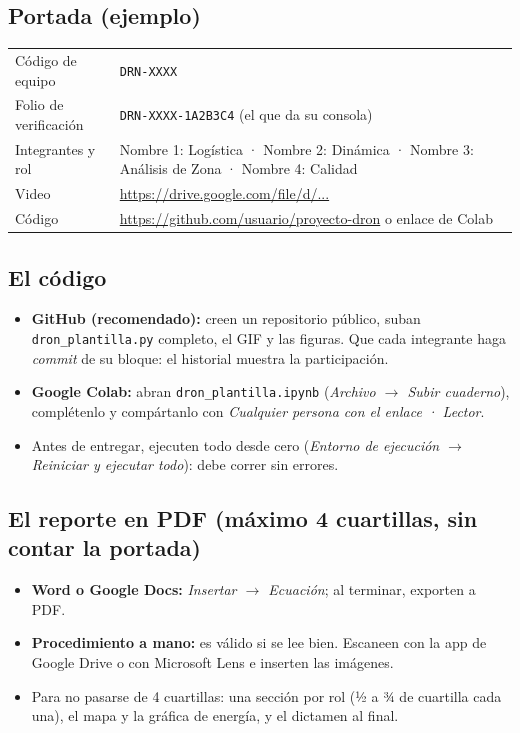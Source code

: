 \documentclass[11pt,letterpaper]{article}
\begin{document}
\subsection*{Portada (ejemplo)}
\begin{center}\small
\begin{tabularx}{0.9\linewidth}{@{}l Y@{}}\toprule
Código de equipo & \texttt{DRN-XXXX} \\
Folio de verificación & \texttt{DRN-XXXX-1A2B3C4} (el que da su consola) \\
Integrantes y rol & Nombre 1: Logística · Nombre 2: Dinámica · Nombre 3: Análisis de Zona · Nombre 4: Calidad \\
Video & \url{https://drive.google.com/file/d/...} \\
Código & \url{https://github.com/usuario/proyecto-dron} o enlace de Colab \\ \bottomrule
\end{tabularx}\end{center}

\subsection*{El código}
\begin{itemize}
\item \textbf{GitHub (recomendado):} creen un repositorio público, suban \texttt{dron\_plantilla.py} completo, el GIF y las figuras. Que cada integrante haga \emph{commit} de su bloque: el historial muestra la participación.
\item \textbf{Google Colab:} abran \texttt{dron\_plantilla.ipynb} (\emph{Archivo \(\rightarrow\) Subir cuaderno}), complétenlo y compártanlo con \emph{Cualquier persona con el enlace · Lector}.
\item Antes de entregar, ejecuten todo desde cero (\emph{Entorno de ejecución \(\rightarrow\) Reiniciar y ejecutar todo}): debe correr sin errores.
\end{itemize}

\subsection*{El reporte en PDF (máximo 4 cuartillas, sin contar la portada)}
\begin{itemize}
\item \textbf{Word o Google Docs:} \emph{Insertar \(\rightarrow\) Ecuación}; al terminar, exporten a PDF.
\item \textbf{Procedimiento a mano:} es válido si se lee bien. Escaneen con la app de Google Drive o con Microsoft Lens e inserten las imágenes.
\item Para no pasarse de 4 cuartillas: una sección por rol (½ a ¾ de cuartilla cada una), el mapa y la gráfica de energía, y el dictamen al final.
\end{itemize}
\end{document}
